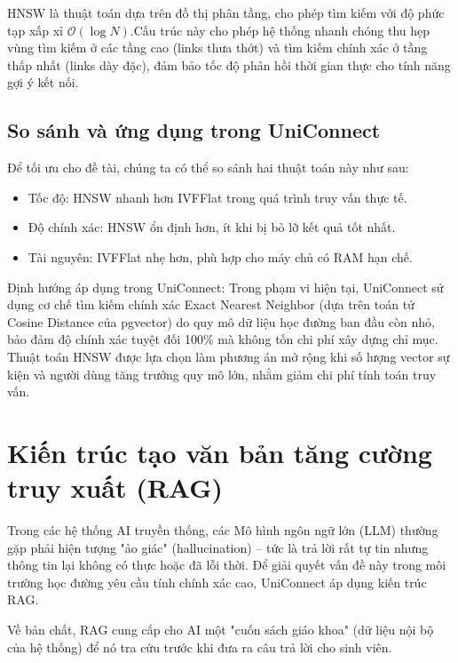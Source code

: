 HNSW là thuật toán dựa trên đồ thị phân tầng, cho phép tìm kiếm với độ phức tạp xấp xỉ $\mathcal{O}(\log N)$\cite{malkov2018efficient}.Cấu trúc này cho phép hệ thống nhanh chóng thu hẹp vùng tìm kiếm ở các tầng cao (links thưa thớt) và tìm kiếm chính xác ở tầng thấp nhất (links dày đặc), đảm bảo tốc độ phản hồi thời gian thực cho tính năng gợi ý kết nối.

\subsection{So sánh và ứng dụng trong UniConnect}

Để tối ưu cho đề tài, chúng ta có thể so sánh hai thuật toán này như sau:

\begin{itemize}
    \item Tốc độ: HNSW nhanh hơn IVFFlat trong quá trình truy vấn thực tế.

    \item Độ chính xác: HNSW ổn định hơn, ít khi bị bỏ lỡ kết quả tốt nhất.
    
    \item Tài nguyên: IVFFlat nhẹ hơn, phù hợp cho máy chủ có RAM hạn chế.
\end{itemize}

Định hướng áp dụng trong UniConnect: Trong phạm vi hiện tại, UniConnect sử dụng cơ chế tìm kiếm chính xác Exact Nearest Neighbor (dựa trên toán tử Cosine Distance của pgvector) do quy mô dữ liệu học đường ban đầu còn nhỏ, bảo đảm độ chính xác tuyệt đối 100\% mà không tốn chi phí xây dựng chỉ mục. Thuật toán HNSW được lựa chọn làm phương án mở rộng khi số lượng vector sự kiện và người dùng tăng trưởng quy mô lớn, nhằm giảm chi phí tính toán truy vấn.

\section{Kiến trúc tạo văn bản tăng cường truy xuất (RAG)}

Trong các hệ thống AI truyền thống, các Mô hình ngôn ngữ lớn (LLM) thường gặp phải hiện tượng "ảo giác" (hallucination) – tức là trả lời rất tự tin nhưng thông tin lại không có thực hoặc đã lỗi thời. Để giải quyết vấn đề này trong môi trường học đường yêu cầu tính chính xác cao, UniConnect áp dụng kiến trúc RAG\cite{lewis2020retrieval}.

Về bản chất, RAG cung cấp cho AI một "cuốn sách giáo khoa" (dữ liệu nội bộ của hệ thống) để nó tra cứu trước khi đưa ra câu trả lời cho sinh viên.

